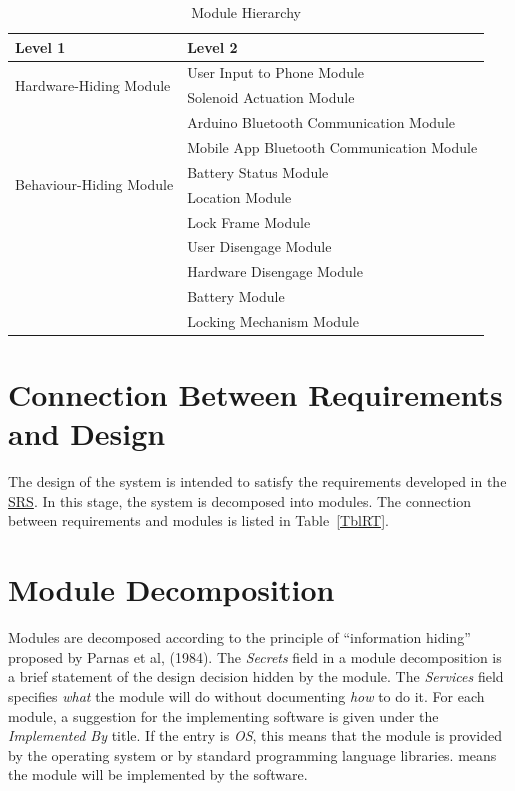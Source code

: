 \documentclass[12pt, titlepage]{article}
\begin{document}
\begin{table}[h!]
\centering
\begin{tabular}{p{} p{}}
\toprule
\textbf{Level 1} & \textbf{Level 2}\\
\midrule

\multirow{2}{0.3\textwidth}{Hardware-Hiding Module} & User Input to Phone Module \\
& Solenoid Actuation Module \\
\midrule

\multirow{6}{0.3\textwidth}{Behaviour-Hiding Module} %
& Arduino Bluetooth Communication Module\\
& Mobile App Bluetooth Communication Module\\
& Battery Status Module \\
& Location Module  \\
& Lock Frame Module \\
\midrule

\multirow{5}{0.3\textwidth}{Software Decision Module} & User Disengage Module \\
& Hardware Disengage Module \\
& Battery Module \\
& Locking Mechanism Module \\
\bottomrule

\end{tabular}
\caption{Module Hierarchy}
\label{TblMH}
\end{table}

\section{Connection Between Requirements and Design} \label{SecConnection}

The design of the system is intended to satisfy the requirements developed in
the \href{https://github.com/NevoAbigail/Capstone/blob/main/docs/SRS/SRS.pdf}{SRS}. In this stage, the system is decomposed into modules. The connection
between requirements and modules is listed in Table~\ref{TblRT}.

\section{Module Decomposition} \label{SecMD}

Modules are decomposed according to the principle of ``information hiding''
proposed by Parnas et al, (1984). The \emph{Secrets} field in a module
decomposition is a brief statement of the design decision hidden by the
module. The \emph{Services} field specifies \emph{what} the module will do
without documenting \emph{how} to do it. For each module, a suggestion for the
implementing software is given under the \emph{Implemented By} title. If the
entry is \emph{OS}, this means that the module is provided by the operating
system or by standard programming language libraries.  \emph{\progname{}} means the
module will be implemented by the \progname{} software.
\end{document}
